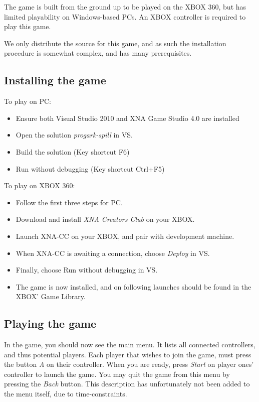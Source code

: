 The game is built from the ground up to be played on the XBOX 360, but
has limited playability on Windows-based PCs.  An XBOX controller is
required to play this game.

We only distribute the source for this game, and as such the installation
procedure is somewhat complex, and has many prerequisites.

\subsection{Installing the game}

To play on PC:
\begin{itemize}
    \item Ensure both Visual Studio 2010 and XNA Game Studio 4.0 are installed
    \item Open the solution \emph{progark-spill} in VS.
    \item Build the solution (Key shortcut F6)
    \item Run without debugging (Key shortcut Ctrl+F5)
\end{itemize}

To play on XBOX 360:
\begin{itemize}
    \item Follow the first three steps for PC.
    \item Download and install \emph{XNA Creators Club} on your XBOX.
    \item Launch XNA-CC on your XBOX, and pair with development machine.
    \item When XNA-CC is awaiting a connection, choose \emph{Deploy} in
          VS.
    \item Finally, choose Run without debugging in VS.
    \item The game is now installed, and on following launches should
          be found in the XBOX' Game Library.
\end{itemize}

\subsection{Playing the game}

In the game, you should now see the main menu. It lists all connected 
controllers, and thus potential players. Each player that wishes to join the
game, must press the button \emph{A} on their controller. When you are ready,
press \emph{Start} on player ones' controller to launch the game.  You may quit 
the game from this menu by pressing the \emph{Back} button.  This
description has unfortunately not been added to the menu itself, due to
time-constraints.

